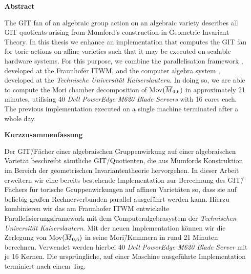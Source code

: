 \begin{center}
	\Large \textbf{Abstract}
\end{center}

The GIT fan of an algebraic group action on an algebraic variety describes all GIT quotients arising from Mumford's construction in Geometric Invariant Theory. In this thesis we enhance an implementation that computes the GIT fan for toric actions on affine varieties such that it may be executed on scalable hardware systems. For this purpose, we combine the parallelisation framework \gpispace{}, developed at the \acl{Fraunhofer ITWM}, and the computer algebra system \singular{}, developed at the \emph{Technische Universität Kaiserslautern}. In doing so, we are able to compute the Mori chamber decomposition of $\text{Mov}(\overline{M}_{0,6})$ in approximately 21 minutes, utilising 40 \emph{Dell PowerEdge M620 Blade Servers} with 16 cores each. The previous implementation executed on a single machine terminated after a whole day.


\begin{center}
\Large \textbf{Kurzzusammenfassung}
\end{center}

Der GIT\=/Fächer einer algebraischen Gruppenwirkung auf einer algebraischen Varietät beschreibt sämtliche GIT\=/Quotienten, die aus Mumfords Konstruktion im Bereich der geometrischen Invariantentheorie hervorgehen. In dieser Arbeit erweitern wir eine bereits bestehende Implementation zur Berechnung des GIT\=/Fächers für torische Gruppenwirkungen auf affinen Varietäten so, dass sie auf beliebig großen Rechnerverbunden parallel ausgeführt werden kann. Hierzu kombinieren wir das am \acl{Fraunhofer ITWM} entwickelte Parallelisierungsframework \gpispace{} mit dem Computeralgebrasystem \singular{} der \emph{Technischen Universität Kaiserslautern}. Mit der neuen Implementation können wir die Zerlegung von $\text{Mov}(\overline{M}_{0,6})$ in seine Mori\=/Kammern in rund 21 Minuten berechnen. Verwendet werden hierbei 40 \emph{Dell PowerEdge M620 Blade Server} mit je 16 Kernen. Die ursprüngliche, auf einer Maschine ausgeführte Implementation terminiert nach einem Tag.